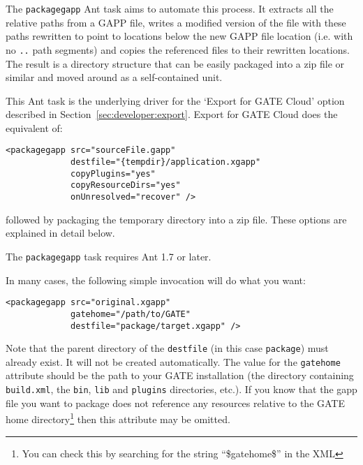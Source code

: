 The \texttt{packagegapp} Ant task aims to automate this process.  It extracts
all the relative paths from a GAPP file, writes a modified version of the file
with these paths rewritten to point to locations below the new GAPP file
location (i.e. with no \texttt{..} path segments) and copies the referenced
files to their rewritten locations.  The result is a directory structure that
can be easily packaged into a zip file or similar and moved around as a
self-contained unit.

This Ant task is the underlying driver for the `Export for GATE Cloud' option
described in Section~\ref{sec:developer:export}.  Export for GATE Cloud does the
equivalent of:
\begin{small}
\begin{verbatim}
<packagegapp src="sourceFile.gapp"
             destfile="{tempdir}/application.xgapp"
             copyPlugins="yes"
             copyResourceDirs="yes"
             onUnresolved="recover" />
\end{verbatim}
\end{small}
followed by packaging the temporary directory into a zip file.  These options
are explained in detail below.

The \texttt{packagegapp} task requires Ant 1.7 or later.


In many cases, the following simple invocation will do what you want:

\begin{small}
\begin{verbatim}
<packagegapp src="original.xgapp"
             gatehome="/path/to/GATE"
             destfile="package/target.xgapp" />
\end{verbatim}
\end{small}

Note that the parent directory of the \texttt{destfile} (in this case
\texttt{package}) must already exist.  It will not be created automatically.
The value for the \verb|gatehome| attribute should be the path to your GATE
installation (the directory containing \verb|build.xml|, the \verb|bin|,
\verb|lib| and \verb|plugins| directories, etc.).  If you know that the gapp
file you want to package does not reference any resources relative to the GATE
home directory\footnote{You can check this by searching for the string
``\$gatehome\$'' in the XML} then this attribute may be omitted.

